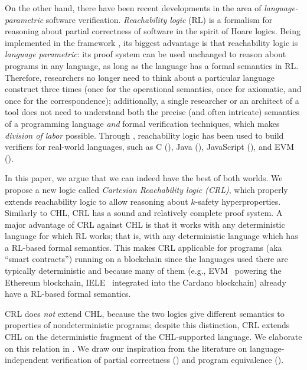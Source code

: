 On the other hand, there have been recent developments in the area of
\emph{language-parametric} software verification.  \emph{Reachability logic}
(RL) \cite{RosuS12oopsla,RosuSCM13lics,StefanescuCMMSR19} is a formalism for
reasoning about partial correctness of software in the spirit of Hoare
logics.  Being implemented in the \K{} framework \cite{KVision}, its biggest
advantage is that reachability logic is \emph{language parametric}: its proof
system can be used unchanged to reason about programs in any language, as long
as the language has a formal semantics in RL.  Therefore, researchers no
longer need to think about a particular language construct three times (once
for the operational semantics, once for axiomatic, and once for the
correspondence); additionally, a single researcher or an architect of a tool does not
need to understand both the precise (and often intricate) semantics of a
programming language \emph{and} formal verification techniques, which makes
\emph{division of labor} possible.  Through \K{}, reachability logic has been
used to build verifiers for real-world languages, such as C (\cite{RVMatch}),
Java (\cite{StefanescuPYLR16VerifiersForAll}), JavaScript
(\cite{StefanescuPYLR16VerifiersForAll}), and EVM
(\cite{KevmVerificationTool}).

In this paper, we argue that we can indeed have the best of both worlds.  We
propose a new logic called \emph{Cartesian Reachability logic (CRL)}, which
properly extends reachability logic to allow reasoning about $k$-safety
hyperproperties. Similarly to CHL, CRL has a sound and relatively complete
proof system. A major advantage of CRL against CHL is that it works with any
deterministic
language for which RL works; that is, with any deterministic language which has a RL-based
formal semantics.
This makes CRL applicable for programs (aka ``smart contracts'') running on a blockchain
since the languages used there are typically deterministic
and because many of them (e.g., EVM~\cite{HildenbrandtSRZ18} powering the Ethereum blockchain, IELE~\cite{KasampalisGMSZF19} integrated into the Cardano blockchain)
already have a RL-based formal semantics.

CRL does \emph{not} extend CHL, because the two
logics give different semantics to properties of nondeterministic programs;
despite this distinction, CRL extends CHL on the deterministic fragment of the
CHL-supported language.  We elaborate on this relation in
.  We draw our inspiration from the literature on
language-independent verification of partial correctness
(\cite{RosuS12oopsla,RosuSCM13lics,StefanescuCMMSR19}) and program equivalence
(\cite{CiobacaLRR16,CiobacaLRR14}).  


